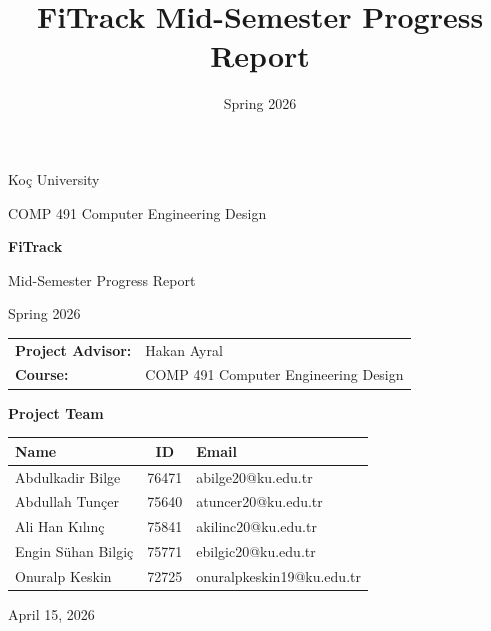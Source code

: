 \documentclass[12pt,a4paper]{article}
\title{FiTrack Mid-Semester Progress Report}
\author{}
\date{Spring 2026}
\begin{document}
\begin{titlepage}
    \centering
    {\Large Ko\c{c} University\par}
    \vspace{0.4cm}
    {\large COMP 491 Computer Engineering Design\par}
    \vspace{1.6cm}

    {\Huge \textbf{FiTrack}\par}
    \vspace{0.4cm}
    {\LARGE Mid-Semester Progress Report\par}
    \vspace{1.2cm}

    {\large Spring 2026\par}
    \vspace{1.6cm}

    \begin{tabular}{ll}
        \textbf{Project Advisor:} & Hakan Ayral \\
        \textbf{Course:} & COMP 491 Computer Engineering Design \\
    \end{tabular}

    \vspace{1.5cm}

    {\large \textbf{Project Team}\par}
    \vspace{0.6cm}

    \renewcommand{\arraystretch}{1.25}
    \begin{tabularx}{0.95\textwidth}{>{\raggedright\arraybackslash}X c >{\raggedright\arraybackslash}X}
        \toprule
        \textbf{Name} & \textbf{ID} & \textbf{Email} \\
        \midrule
        Abdulkadir Bilge & 76471 & abilge20@ku.edu.tr \\
        Abdullah Tun\c{c}er & 75640 & atuncer20@ku.edu.tr \\
        Ali Han K{\i}l{\i}n\c{c} & 75841 & akilinc20@ku.edu.tr \\
        Engin S\"uhan Bilgi\c{c} & 75771 & ebilgic20@ku.edu.tr \\
        Onuralp Keskin & 72725 & onuralpkeskin19@ku.edu.tr \\
        \bottomrule
    \end{tabularx}

    \vfill
    {\large April 15, 2026\par}
\end{titlepage}
\end{document}
